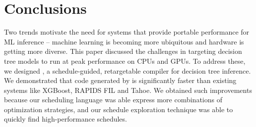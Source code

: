 \section{Conclusions}
\label{sec:conclusion}
Two trends motivate the need for systems that provide portable performance for
ML inference -- machine learning is becoming more ubiquitous and hardware is
getting more diverse.  This paper discussed the challenges in targeting decision
tree models to run at peak performance on CPUs and GPUs. To address these, we
designed \Treebeard{}, a schedule-guided, retargetable compiler for decision
tree inference. We demonstrated that code generated by \Treebeard{} is
significantly faster than existing systems like XGBoost, RAPIDS FIL and Tahoe.
We obtained such improvements because our scheduling language was able express
more combinations of optimization strategies, and our schedule exploration
technique was able to quickly find high-performance schedules.
